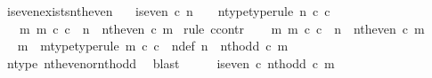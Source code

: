 \begin{isabellebody}
\isanewline
%
\endisadelimproof
\isanewline
{}\isamarkupfalse%
\ is{\isacharunderscore}{\kern0pt}even{\isacharunderscore}{\kern0pt}exists{\isacharunderscore}{\kern0pt}nth{\isacharunderscore}{\kern0pt}even{\isacharcolon}{\kern0pt}\isanewline
\ \ \ {\isachardoublequoteopen}is{\isacharunderscore}{\kern0pt}even\ {\isasymcirc}\isactrlsub c\ n\ {\isacharequal}{\kern0pt}\ {\isasymt}{\isachardoublequoteclose}\ \ n{\isacharunderscore}{\kern0pt}type{\isacharbrackleft}{\kern0pt}type{\isacharunderscore}{\kern0pt}rule{\isacharbrackright}{\kern0pt}{\isacharcolon}{\kern0pt}\ {\isachardoublequoteopen}n\ {\isasymin}\isactrlsub c\ {\isasymnat}\isactrlsub c{\isachardoublequoteclose}\isanewline
\ \ \ {\isachardoublequoteopen}{\isasymexists}m{\isachardot}{\kern0pt}\ m\ {\isasymin}\isactrlsub c\ {\isasymnat}\isactrlsub c\ {\isasymand}\ n\ {\isacharequal}{\kern0pt}\ nth{\isacharunderscore}{\kern0pt}even\ {\isasymcirc}\isactrlsub c\ m{\isachardoublequoteclose}\isanewline
%
\isadelimproof
%
\endisadelimproof
%
\isatagproof
{}\isamarkupfalse%
\ {\isacharparenleft}{\kern0pt}rule\ ccontr{\isacharparenright}{\kern0pt}\isanewline
\ \ \isamarkupfalse%
\ {\isachardoublequoteopen}{\isasymnexists}m{\isachardot}{\kern0pt}\ m\ {\isasymin}\isactrlsub c\ {\isasymnat}\isactrlsub c\ {\isasymand}\ n\ {\isacharequal}{\kern0pt}\ nth{\isacharunderscore}{\kern0pt}even\ {\isasymcirc}\isactrlsub c\ m{\isachardoublequoteclose}\isanewline
\ \ \isamarkupfalse%
\ \isamarkupfalse%
\ m\ \ m{\isacharunderscore}{\kern0pt}type{\isacharbrackleft}{\kern0pt}type{\isacharunderscore}{\kern0pt}rule{\isacharbrackright}{\kern0pt}{\isacharcolon}{\kern0pt}\ {\isachardoublequoteopen}m\ {\isasymin}\isactrlsub c\ {\isasymnat}\isactrlsub c{\isachardoublequoteclose}\ \ n{\isacharunderscore}{\kern0pt}def{\isacharcolon}{\kern0pt}\ {\isachardoublequoteopen}n\ {\isacharequal}{\kern0pt}\ nth{\isacharunderscore}{\kern0pt}odd\ {\isasymcirc}\isactrlsub c\ m{\isachardoublequoteclose}\isanewline
\ \ \ \ \isamarkupfalse%
\ n{\isacharunderscore}{\kern0pt}type\ nth{\isacharunderscore}{\kern0pt}even{\isacharunderscore}{\kern0pt}or{\isacharunderscore}{\kern0pt}nth{\isacharunderscore}{\kern0pt}odd\ \isamarkupfalse%
\ blast\isanewline
\ \ \isamarkupfalse%
\ \isamarkupfalse%
\ {\isachardoublequoteopen}is{\isacharunderscore}{\kern0pt}even\ {\isasymcirc}\isactrlsub c\ nth{\isacharunderscore}{\kern0pt}odd\ {\isasymcirc}\isactrlsub c\ m\ {\isacharequal}{\kern0pt}\ {\isasymt}{\isachardoublequoteclose}\isanewline

\end{isabellebody}
